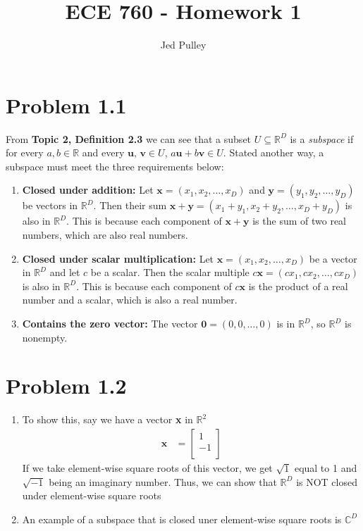 \documentclass{article}
\title{ECE 760 - Homework 1}
\author{Jed Pulley }
\date{}
\begin{document}
\maketitle

\FloatBarrier
\section*{Problem 1.1}
From \textbf{Topic 2, Definition 2.3} we can see that a subset $U \subseteq \mathbb{R}^D$ is a \textit{subspace} if for every $a, b \in \mathbb{R}$ and every $\textbf{u, v} \in U$, $a\textbf{u} + b\textbf{v} \in U$. Stated another way, a subspace must meet the three requirements below:

\begin{enumerate}
    \item \textbf{Closed under addition:} Let $\mathbf{x} = (x_1, x_2, \dots, x_D)$ and $\mathbf{y} = (y_1, y_2, \dots, y_D)$ be vectors in \(\mathbb{R}^{D}\). 
    Then their sum $\mathbf{x} + \mathbf{y} = (x_1 + y_1, x_2 + y_2, \dots, x_D + y_D)$ is also in \(\mathbb{R}^{D}\). This is because each component of \(\mathbf{x}+\mathbf{y}\) is the sum of two real numbers, which are also real numbers.
    \item \textbf{Closed under scalar multiplication:} Let $\mathbf{x} = (x_1, x_2, \dots, x_D)$ be a vector in \(\mathbb{R}^{D}\) and let \(c\) be a scalar. Then the scalar multiple $c\mathbf{x} = (cx_1, cx_2, \dots, cx_D)$ is also in \(\mathbb{R}^{D}\). This is because each component of \(c\mathbf{x}\) is the product of a real number and a scalar, which is also a real number.
    \item \textbf{Contains the zero vector:} The vector $\mathbf{0} = (0, 0, \dots, 0)$ is in \(\mathbb{R}^{D}\), so \(\mathbb{R}^{D}\) is nonempty. 
\end{enumerate}

\FloatBarrier
\section*{Problem 1.2}
\begin{enumerate}[label=(\alph*)]
    \item To show this, say we have a vector \textbf{x} in $\mathbb{R}^2$
\begin{align}
    \textbf{x} &= \begin{bmatrix}
           1 \\
           -1 \\
         \end{bmatrix}
\end{align}
If we take element-wise square roots of this vector, we get $\sqrt{1}$ equal to 1 and $\sqrt{-1}$ being an imaginary number. Thus, we can show that $\mathbb{R}^D$ is NOT closed under element-wise square roots

    \item An example of a subspace that is closed uner element-wise square roots is $\mathbb{C}^D$
\end{enumerate}
\end{document}
